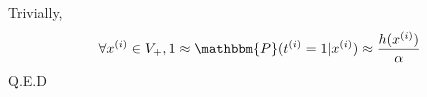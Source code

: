 \begin{answer}
Trivially, 
$$
\begin{aligned}
\forall x^{(i)} \in V_+, 1 \approx \mathbbm{P}(t^{(i)}=1|x^{(i)}) \approx \frac{h(x^{(i)})}{\alpha}
\end{aligned}
$$
Q.E.D
\end{answer}
